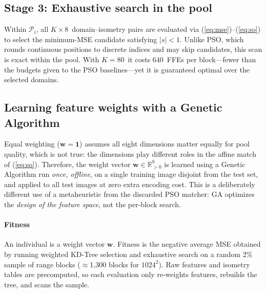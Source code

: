\documentclass[conference, a4paper]{IEEEtran}
\begin{document}
\subsection{Stage 3: Exhaustive search in the pool}
Within \mbox{$\mathcal{P}_i$}, all \mbox{$K\!\times\!8$}~domain--isometry pairs are evaluated via (\ref{eq:mse})--(\ref{eq:so}) to select the minimum-MSE candidate satisfying \mbox{$|s|<1$}. Unlike PSO, which rounds continuous positions to discrete indices and may skip candidates, this scan is exact within the pool. With \mbox{$K\!=\!80$}~it costs \mbox{$640$}~FFEs per block---fewer than the budgets given to the PSO baselines---yet it is guaranteed optimal over the selected domains.


\subsection{Learning feature weights with a Genetic Algorithm}
\label{sec:ga_weights}

Equal weighting (\mbox{$\mathbf w=\mathbf 1$}) assumes all eight dimensions matter equally for pool quality, which is not true: the dimensions play different roles in the affine match of (\ref{eq:so}). Therefore, the weight vector \mbox{$\mathbf w\in\mathbb{R}^8_{>0}$} is learned using a Genetic Algorithm run \emph{once, offline}, on a single training image disjoint from the test set, and applied to all test images at zero extra encoding cost. This is a deliberately different use of a metaheuristic from the discarded PSO matcher: GA optimizes the \emph{design of the feature space}, not the per-block search.

\paragraph*{Fitness} An individual is a weight vector \mbox{$\mathbf w$}. Fitness is the negative average MSE obtained by running weighted KD-Tree selection and exhaustive search on a random 2\% sample of range blocks (\mbox{$\approx$}1{,}300 blocks for \mbox{$1024^2$}). Raw features and isometry tables are precomputed, so each evaluation only re-weights features, rebuilds the tree, and scans the sample.
\end{document}

